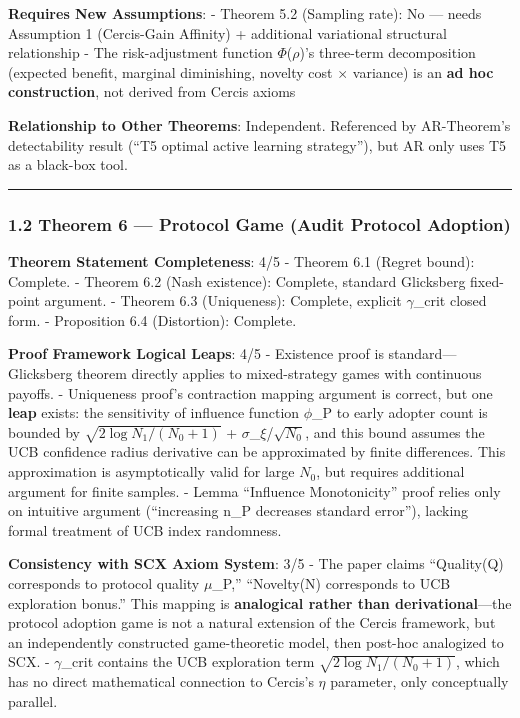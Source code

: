 \documentclass[
  12pt,
]{article}
\begin{document}
\textbf{Requires New Assumptions}:
- Theorem 5.2 (Sampling rate): No --- needs Assumption 1 (Cercis-Gain Affinity) + additional variational structural relationship
- The risk-adjustment function $\Phi$($\rho$)'s three-term decomposition (expected benefit, marginal diminishing, novelty cost $\times$ variance) is an \textbf{ad hoc construction}, not derived from Cercis axioms

\textbf{Relationship to Other Theorems}: Independent. Referenced by AR-Theorem's detectability result (``T5 optimal active learning strategy''), but AR only uses T5 as a black-box tool.

\begin{center}\rule{0.5\linewidth}{0.5pt}\end{center}

\subsubsection{1.2 Theorem 6 --- Protocol Game (Audit Protocol Adoption)}\label{theorem-6-protocol-game}

\textbf{Theorem Statement Completeness}: 4/5
- Theorem 6.1 (Regret bound): Complete.
- Theorem 6.2 (Nash existence): Complete, standard Glicksberg fixed-point argument.
- Theorem 6.3 (Uniqueness): Complete, explicit $\gamma$\_crit closed form.
- Proposition 6.4 (Distortion): Complete.

\textbf{Proof Framework Logical Leaps}: 4/5
- Existence proof is standard---Glicksberg theorem directly applies to mixed-strategy games with continuous payoffs.
- Uniqueness proof's contraction mapping argument is correct, but one \textbf{leap} exists: the sensitivity of influence function $\phi$\_P to early adopter count is bounded by $\sqrt{2\log N_1/(N_0+1)}$ + $\sigma$\_$\xi$/$\sqrt{N_0}$, and this bound assumes the UCB confidence radius derivative can be approximated by finite differences. This approximation is asymptotically valid for large $N_0$, but requires additional argument for finite samples.
- Lemma ``Influence Monotonicity'' proof relies only on intuitive argument (``increasing n\_P decreases standard error''), lacking formal treatment of UCB index randomness.

\textbf{Consistency with SCX Axiom System}: 3/5
- The paper claims ``Quality(Q) corresponds to protocol quality $\mu$\_P,'' ``Novelty(N) corresponds to UCB exploration bonus.'' This mapping is \textbf{analogical rather than derivational}---the protocol adoption game is not a natural extension of the Cercis framework, but an independently constructed game-theoretic model, then post-hoc analogized to SCX.
- $\gamma$\_crit contains the UCB exploration term $\sqrt{2\log N_1/(N_0+1)}$, which has no direct mathematical connection to Cercis's $\eta$ parameter, only conceptually parallel.
\end{document}
